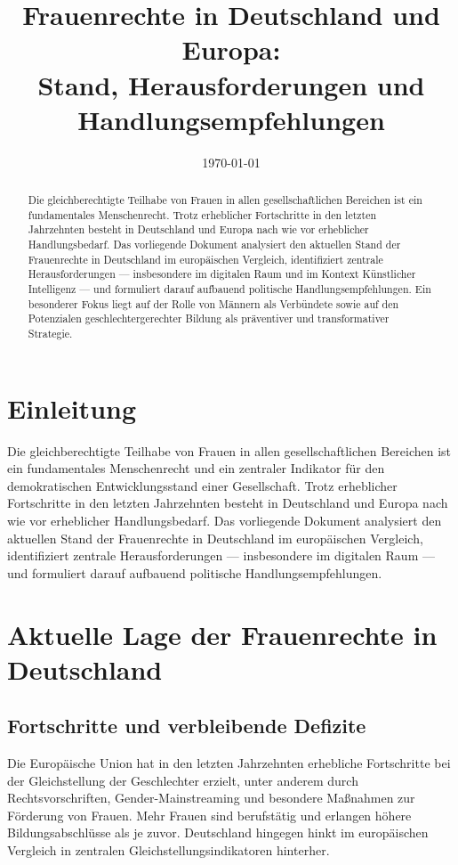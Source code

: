 \documentclass[12pt,a4paper]{article}
\title{Frauenrechte in Deutschland und Europa:\\Stand, Herausforderungen und Handlungsempfehlungen}
\author{}
\date{\today}
\begin{document}
	
	\maketitle
	
	\begin{abstract}
		Die gleichberechtigte Teilhabe von Frauen in allen gesellschaftlichen Bereichen ist ein fundamentales Menschenrecht. Trotz erheblicher Fortschritte in den letzten Jahrzehnten besteht in Deutschland und Europa nach wie vor erheblicher Handlungsbedarf. Das vorliegende Dokument analysiert den aktuellen Stand der Frauenrechte in Deutschland im europäischen Vergleich, identifiziert zentrale Herausforderungen — insbesondere im digitalen Raum und im Kontext Künstlicher Intelligenz — und formuliert darauf aufbauend politische Handlungsempfehlungen. Ein besonderer Fokus liegt auf der Rolle von Männern als Verbündete sowie auf den Potenzialen geschlechtergerechter Bildung als präventiver und transformativer Strategie.
	\end{abstract}
	
	\newpage
	
	\section{Einleitung}
	
	Die gleichberechtigte Teilhabe von Frauen in allen gesellschaftlichen Bereichen ist ein fundamentales Menschenrecht und ein zentraler Indikator für den demokratischen Entwicklungsstand einer Gesellschaft. Trotz erheblicher Fortschritte in den letzten Jahrzehnten besteht in Deutschland und Europa nach wie vor erheblicher Handlungsbedarf. Das vorliegende Dokument analysiert den aktuellen Stand der Frauenrechte in Deutschland im europäischen Vergleich, identifiziert zentrale Herausforderungen — insbesondere im digitalen Raum — und formuliert darauf aufbauend politische Handlungsempfehlungen.
	
	\section{Aktuelle Lage der Frauenrechte in Deutschland}
	
	\subsection{Fortschritte und verbleibende Defizite}
	
	Die Europäische Union hat in den letzten Jahrzehnten erhebliche Fortschritte bei der Gleichstellung der Geschlechter erzielt, unter anderem durch Rechtsvorschriften, Gender-Mainstreaming und besondere Maßnahmen zur Förderung von Frauen. Mehr Frauen sind berufstätig und erlangen höhere Bildungsabschlüsse als je zuvor. Deutschland hingegen hinkt im europäischen Vergleich in zentralen Gleichstellungsindikatoren hinterher.
	
\end{document}
